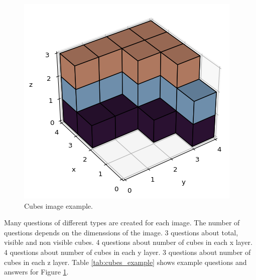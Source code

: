 \documentclass[11pt]{article}
\begin{document}
\begin{figure}
    \centering
    \includegraphics[width=\linewidth]{cubes_4_4_3_0002_0013_1133_3333.png}
    \caption{Cubes image example.}
    \label{fig:cubes_example}
\end{figure}

Many questions of different types are created for each image. The number of questions depends on the dimenssions of the image. 3 questions about total, visible and non visible cubes. 4 questions about number of cubes in each x layer. 4 questions about number of cubes in each y layer. 3 questions about number of cubes in each z layer. Table \ref{tab:cubes_example} shows example questions and answers for Figure \ref{fig:cubes_example}.
\end{document}
